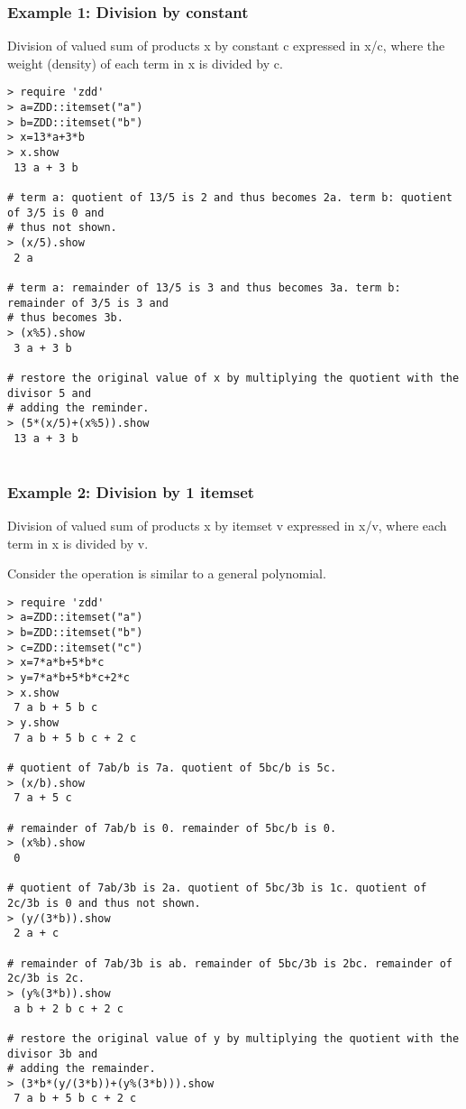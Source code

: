\subsubsection*{Example 1: Division by constant}

Division of valued sum of products x by constant c expressed in x/c,
where the weight (density) of each term in x is divided by c.



\begin{Verbatim}[baselinestretch=0.7,frame=single]
> require 'zdd'
> a=ZDD::itemset("a")
> b=ZDD::itemset("b")
> x=13*a+3*b
> x.show
 13 a + 3 b

# term a: quotient of 13/5 is 2 and thus becomes 2a. term b: quotient of 3/5 is 0 and
# thus not shown.
> (x/5).show
 2 a

# term a: remainder of 13/5 is 3 and thus becomes 3a. term b: remainder of 3/5 is 3 and
# thus becomes 3b.
> (x%5).show
 3 a + 3 b

# restore the original value of x by multiplying the quotient with the divisor 5 and
# adding the reminder.
> (5*(x/5)+(x%5)).show
 13 a + 3 b


\end{Verbatim}
\subsubsection*{Example 2: Division by 1 itemset}

 Division of valued sum of products x by itemset v expressed in x/v, where each term in x is divided by v.

Consider the operation is similar to a general polynomial.


\begin{Verbatim}[baselinestretch=0.7,frame=single]
> require 'zdd'
> a=ZDD::itemset("a")
> b=ZDD::itemset("b")
> c=ZDD::itemset("c")
> x=7*a*b+5*b*c
> y=7*a*b+5*b*c+2*c
> x.show
 7 a b + 5 b c
> y.show
 7 a b + 5 b c + 2 c

# quotient of 7ab/b is 7a. quotient of 5bc/b is 5c.
> (x/b).show
 7 a + 5 c

# remainder of 7ab/b is 0. remainder of 5bc/b is 0.
> (x%b).show
 0

# quotient of 7ab/3b is 2a. quotient of 5bc/3b is 1c. quotient of 2c/3b is 0 and thus not shown.
> (y/(3*b)).show
 2 a + c

# remainder of 7ab/3b is ab. remainder of 5bc/3b is 2bc. remainder of 2c/3b is 2c.
> (y%(3*b)).show
 a b + 2 b c + 2 c

# restore the original value of y by multiplying the quotient with the divisor 3b and
# adding the remainder.
> (3*b*(y/(3*b))+(y%(3*b))).show
 7 a b + 5 b c + 2 c
\end{Verbatim}
